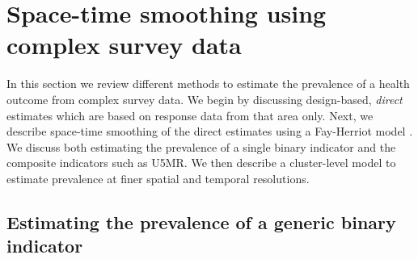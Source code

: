 \section{Space-time smoothing using complex survey data}\label{space-time-smoothing-using-complex-survey-data}

In this section we review different methods to estimate the prevalence of a health outcome from complex survey data. We begin by discussing design-based, \emph{direct} estimates \citep{rao_molina_15} which are based on response data from that area only. Next, we describe space-time smoothing of the direct estimates using a Fay-Herriot model \citep{fay_herriot_79}. We discuss both estimating the prevalence of a single binary indicator and the composite indicators such as U5MR. We then describe a cluster-level model to estimate prevalence at finer spatial and temporal resolutions.

\subsection{Estimating the prevalence of a generic binary indicator}\label{estimating-the-prevalence-of-a-generic-binary-indicator}

